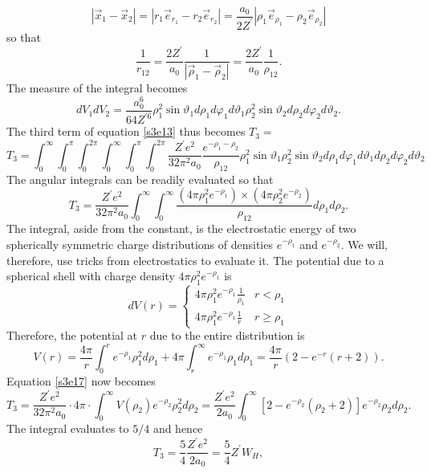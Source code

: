 \documentclass{article}
\numberwithin{equation}{section}
\begin{document}
\[
|\vec{x}_1 - \vec{x}_2| = |r_1 \vec{e}_{r_1} - r_2 \vec{e}_{r_2}| = \frac{a_0}{2Z^\prime}|\rho_1\vec{e}_{\rho_1} - \rho_2\vec{e}_{\rho_2}|
\]
so that
\begin{equation}\label{s3e14}
\frac{1}{r_{12}} = \frac{2Z^\prime}{a_0}\frac{1}{|\vec{\rho}_1 - \vec{\rho}_2|} = \frac{2Z^\prime}{a_0}\frac{1}{\rho_{12}}.
\end{equation}
The measure of the integral becomes
\begin{equation}\label{s3e15}
dV_1 dV_2 = \frac{a_0^6}{64 Z^{\prime 6}}\rho_1^2\sin\vartheta_1d\rho_1 d\varphi_1 d\vartheta_1\rho_2^2\sin\vartheta_2d\rho_2 d\varphi_2 d\vartheta_2.
\end{equation}
The third term of equation \eqref{s3e13} thus becomes $T_3 = $
\begin{equation}\label{s3e16}
T_3 = \int_0^\infty\int_0^\pi\int_0^{2\pi}\int_0^\infty\int_0^\pi\int_0^{2\pi}\frac{Z^\prime e^2}{32\pi^2 a_0}\frac{e^{-\rho_1 - \rho_2}}{\rho_{12}}\rho_1^2\sin\vartheta_1\rho_2^2\sin\vartheta_2 
d\rho_1d\varphi_1d\vartheta_1 d\rho_2d\varphi_2d\vartheta_2
\end{equation}
The angular integrals can be readily evaluated so that
\begin{equation}\label{s3e17}
T_3 = \frac{Z^\prime e^2}{32\pi^2 a_0}\int_0^\infty\int_0^\infty \frac{(4\pi\rho_1^2e^{-\rho_1}) \times (4\pi\rho_2^2e^{-\rho_2})}{\rho_{12}}d\rho_1 d\rho_2.
\end{equation}
The integral, aside from the constant, is the electrostatic energy of two
spherically symmetric charge distributions of densities $e^{-\rho_1}$ and
$e^{-\rho_2}$. We will, therefore, use tricks from electrostatics to evaluate
it. The potential due to a spherical shell with charge density $4\pi\rho_1^2e^{-\rho_1}$
is
\[
dV(r) = \begin{cases}
4\pi\rho_1^2e^{-\rho_1}\frac{1}{\rho_1} & r < \rho_1 \\
4\pi\rho_1^2e^{-\rho_1}\frac{1}{r}      & r \ge \rho_1
\end{cases}
\]
Therefore, the potential at $r$ due to the entire distribution is
\[
V(r) = \frac{4\pi}{r}\int_0^re^{-\rho_1}\rho_1^2d\rho_1 + 4\pi\int_r^\infty e^{-\rho_1}\rho_1d\rho_1 = \frac{4\pi}{r}(2 - e^{-r}(r + 2)).
\]
Equation \eqref{s3e17} now becomes
\[
T_3 = \frac{Z^\prime e^2}{32\pi^2 a_0}\cdot 4\pi\cdot\int_0^\infty V(\rho_2)e^{-\rho_2}\rho_2^2d\rho_2
 = \frac{Z^\prime e^2}{2a_0}\int_0^\infty [2 - e^{-\rho_2}(\rho_2 +2)]e^{-\rho_2}\rho_2d\rho_2.
\]
The integral evaluates to $5/4$ and hence
\begin{equation}\label{s3e18}
T_3 = \frac{5}{4}\frac{Z^\prime e^2}{2a_0} = \frac{5}{4}Z^\prime W_H,
\end{equation}
\end{document}
